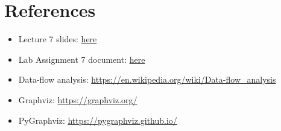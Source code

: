 \documentclass[10pt,a4paper]{report}
\begin{document}
\section{References}
\begin{itemize}[itemsep=0em, topsep=0pt]
    \item Lecture 7 slides: \href{https://drive.google.com/file/d/1cMLqFTzRJcpvq8iTEL4XV0K9BclsALzE/view}{here}
    \item Lab Assignment 7 document: \href{https://drive.google.com/file/d/1x6MDZ6e2PJ0MFn6u2U8NPzMxtcuhOy2t/view}{here}
    \item Data-flow analysis: \url{https://en.wikipedia.org/wiki/Data-flow_analysis}
    \item Graphviz: \url{https://graphviz.org/}
    \item PyGraphviz: \url{https://pygraphviz.github.io/}
\end{itemize}
\end{document}
